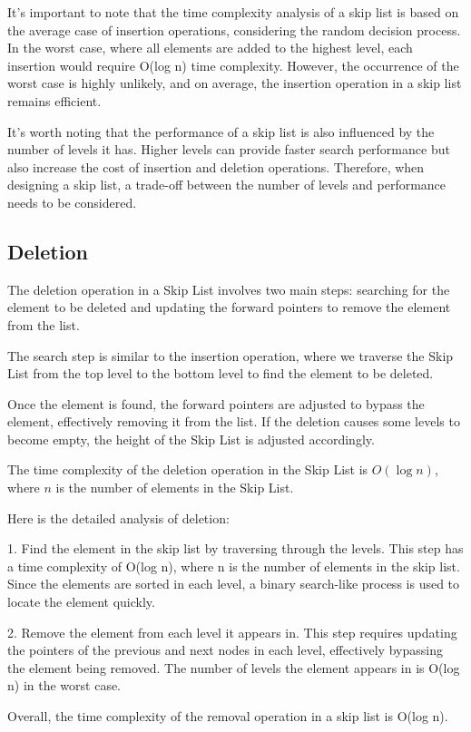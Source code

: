 \documentclass[12pt]{article}
\begin{document}
It's important to note that the time complexity analysis of a skip list is based on the average case of insertion operations, considering the random decision process. In the worst case, where all elements are added to the highest level, each insertion would require O(log n) time complexity. However, the occurrence of the worst case is highly unlikely, and on average, the insertion operation in a skip list remains efficient.

It's worth noting that the performance of a skip list is also influenced by the number of levels it has. Higher levels can provide faster search performance but also increase the cost of insertion and deletion operations. Therefore, when designing a skip list, a trade-off between the number of levels and performance needs to be considered.
\subsection{Deletion}
The deletion operation in a Skip List involves two main steps: searching for the element to be deleted and updating the forward pointers to remove the element from the list.

The search step is similar to the insertion operation, where we traverse the Skip List from the top level to the bottom level to find the element to be deleted.

Once the element is found, the forward pointers are adjusted to bypass the element, effectively removing it from the list. If the deletion causes some levels to become empty, the height of the Skip List is adjusted accordingly.

The time complexity of the deletion operation in the Skip List is $O(\log n)$, where $n$ is the number of elements in the Skip List.

Here is the detailed analysis of deletion:

1. Find the element in the skip list by traversing through the levels. This step has a time complexity of O(log n), where n is the number of elements in the skip list. Since the elements are sorted in each level, a binary search-like process is used to locate the element quickly.

2. Remove the element from each level it appears in. This step requires updating the pointers of the previous and next nodes in each level, effectively bypassing the element being removed. The number of levels the element appears in is O(log n) in the worst case.

Overall, the time complexity of the removal operation in a skip list is O(log n).
\end{document}
